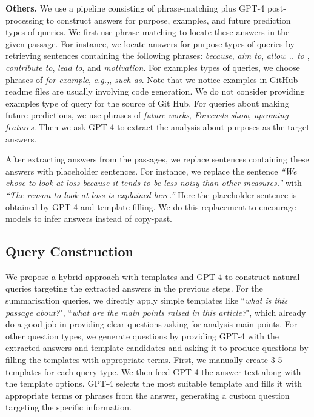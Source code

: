 \documentclass[letterpaper]{article} %
\begin{document}
\noindent\textbf{Others.} We use a pipeline consisting of phrase-matching plus GPT-4 post-processing to construct answers for purpose, examples, and future prediction types of queries. We first use phrase matching to locate these answers in the given passage. For instance, we locate answers for purpose types of queries by retrieving sentences containing the following phrases: \textit{because}, \textit{aim to}, \textit{allow .. to }, \textit{contribute to}, \textit{lead to}, and \textit{motivation}. For examples types of queries, we choose phrases of \textit{for example}, \textit{e.g.,}, \textit{such as}. Note that we notice examples in GitHub readme files are usually involving code generation. We do not consider providing examples type of query for the source of Git Hub. For queries about making future predictions, we use phrases of \textit{future works}, \textit{Forecasts show}, \textit{upcoming features}. Then we ask GPT-4 to extract the analysis about purposes as the target answers.

After extracting answers from the passages, we replace sentences containing these answers with placeholder sentences. For instance, we replace the sentence \textit{``We chose to look at loss because it tends to be less noisy than other measures.''} with \textit{``The reason to look at loss is explained here.''} Here the placeholder sentence is obtained by GPT-4 and template filling. We do this replacement to encourage models to infer answers instead of copy-past.

\subsection{Query Construction}

We propose a hybrid approach with templates and GPT-4 to construct natural queries targeting the extracted answers in the previous steps.
For the summarisation queries, we directly apply simple templates like ``\textit{what is this passage about?}", ``\textit{what are the main points raised in this article?}", which already do a good job in providing clear questions asking for analysis main points. For other question types, we generate questions by providing GPT-4 with the extracted answers and template candidates and asking it to produce questions by filling the templates with appropriate terms. First, we manually create 3-5 templates for each query type. We then feed GPT-4 the answer text along with the template options. GPT-4 selects the most suitable template and fills it with appropriate terms or phrases from the answer, generating a custom question targeting the specific information.
\end{document}
